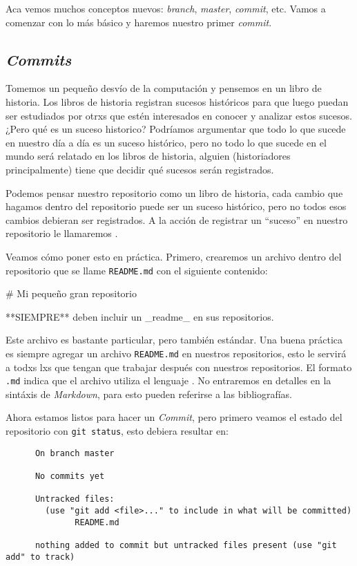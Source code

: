   Aca vemos muchos conceptos nuevos: \textit{branch}, \textit{master}, \textit{commit}, etc.
  Vamos a comenzar con lo más básico y haremos nuestro primer \textit{commit}.

  \subsection{\textit{Commits}}
    Tomemos un pequeño desvío de la computación y pensemos en un libro de historia.
    Los libros de historia registran sucesos históricos para que luego puedan ser estudiados por 
    otrxs que estén interesados en conocer y analizar estos sucesos.
    ¿Pero qué es un suceso historico?
    Podríamos argumentar que todo lo que sucede en nuestro día a día es un suceso histórico, pero no
    todo lo que sucede en el mundo será relatado en los libros de historia, alguien (historiadores 
    principalmente) tiene que decidir qué sucesos serán registrados.

    Podemos pensar nuestro repositorio como un libro de historia, cada cambio que hagamos dentro del
    repositorio puede ser un suceso histórico, pero no todos esos cambios debieran ser registrados.
    A la acción de registrar un \enquote{suceso} en nuestro repositorio le llamaremos .

    Veamos cómo poner esto en práctica.
    Primero, crearemos un archivo dentro del repositorio que se llame \texttt{README.md} con el 
    siguiente contenido:

    \begin{md}
      # Mi pequeño gran repositorio

      **SIEMPRE** deben incluir un _readme_ en sus repositorios.
    \end{md}

    Este archivo es bastante particular, pero también estándar.
    Una buena práctica es siempre agregar un archivo \texttt{README.md} en nuestros repositorios,
    esto le servirá a todxs lxs que tengan que trabajar después con nuestros repositorios.
    El formato \texttt{.md} indica que el archivo utiliza el lenguaje .
    No entraremos en detalles en la sintáxis de \textit{Markdown}, para esto pueden referirse a las
    bibliografías.\autocite{gh-markdown}

    Ahora estamos listos para hacer un \textit{Commit}, pero primero veamos el estado del
    repositorio con \texttt{git status}, esto debiera resultar en:

    \begin{verbatim}
      On branch master

      No commits yet

      Untracked files:
        (use "git add <file>..." to include in what will be committed)
              README.md

      nothing added to commit but untracked files present (use "git add" to track)
    \end{verbatim}

